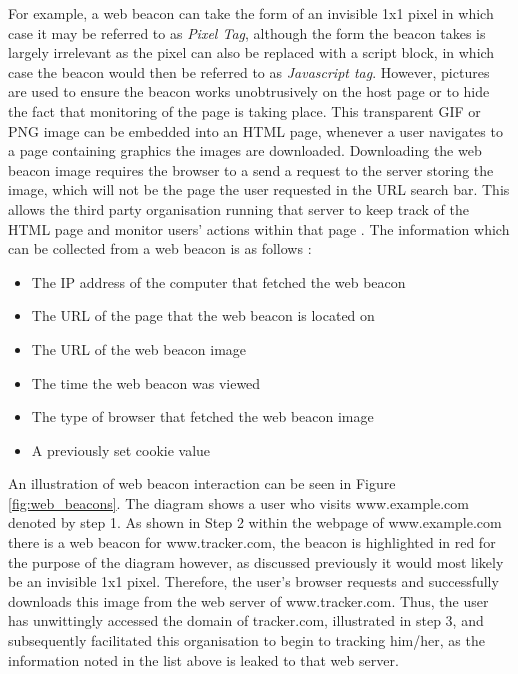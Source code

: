 \documentclass[12pt]{article}
\begin{document}
For example, a web beacon can take the form of an invisible 1x1 pixel in which case it may be referred to as \textit{Pixel Tag}, although the form the beacon takes is largely irrelevant as the pixel can also be replaced with a script block, in which case the beacon would then be referred to as \textit{Javascript tag}. However, pictures are used to ensure the beacon works unobtrusively on the host page or to hide the fact that monitoring of the page is taking place. This transparent GIF or PNG image can be embedded into an HTML page, whenever a user navigates to a page containing graphics the images are downloaded. Downloading the web beacon image requires the browser to a send a request to the server storing the image, which will not be the page the user requested in the URL search bar. This allows the third party organisation running that server to keep track of the HTML page and monitor users' actions within that page \parencite{webBeacons}. The information which can be collected from a web beacon is as follows \parencite{webBug}:

\begin{itemize} \label{}
    \item The IP address of the computer that fetched the web beacon
    \item The URL of the page that the web beacon is located on
    \item The URL of the web beacon image
    \item The time the web beacon was viewed
    \item The type of browser that fetched the web beacon image
    \item A previously set cookie value
\end{itemize}

An illustration of web beacon interaction can be seen in Figure \ref{fig:web_beacons}. The diagram shows a user who visits www.example.com denoted by step 1. As shown in Step 2 within the webpage of www.example.com there is a web beacon for  www.tracker.com, the beacon is highlighted in red for the purpose of the diagram however, as discussed previously it would most likely be an invisible 1x1 pixel. Therefore, the user's browser requests and successfully downloads this image from the web server of www.tracker.com. Thus, the user has unwittingly accessed the domain of tracker.com, illustrated in step 3, and subsequently facilitated this organisation to begin to tracking him/her, as the information noted in the list above is leaked to that web server. 
\end{document}
